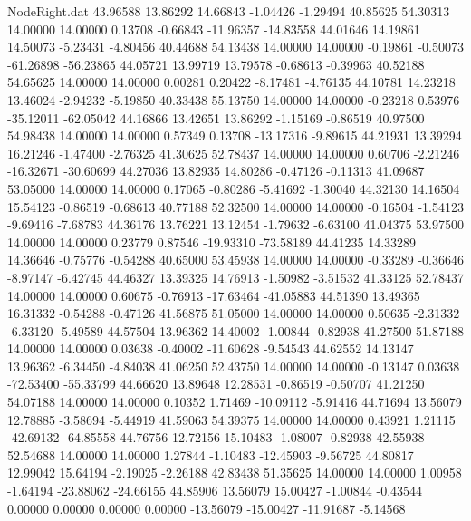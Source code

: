 \begin{filecontents}{NodeRight.dat}
  43.96588   13.86292   14.66843    -1.04426   -1.29494   40.85625   54.30313   14.00000   14.00000    0.13708   -0.66843  -11.96357  -14.83558
  44.01646   14.19861   14.50073    -5.23431   -4.80456   40.44688   54.13438   14.00000   14.00000   -0.19861   -0.50073  -61.26898  -56.23865
  44.05721   13.99719   13.79578    -0.68613   -0.39963   40.52188   54.65625   14.00000   14.00000    0.00281    0.20422   -8.17481   -4.76135
  44.10781   14.23218   13.46024    -2.94232   -5.19850   40.33438   55.13750   14.00000   14.00000   -0.23218    0.53976  -35.12011  -62.05042
  44.16866   13.42651   13.86292    -1.15169   -0.86519   40.97500   54.98438   14.00000   14.00000    0.57349    0.13708  -13.17316   -9.89615
  44.21931   13.39294   16.21246    -1.47400   -2.76325   41.30625   52.78437   14.00000   14.00000    0.60706   -2.21246  -16.32671  -30.60699
  44.27036   13.82935   14.80286    -0.47126   -0.11313   41.09687   53.05000   14.00000   14.00000    0.17065   -0.80286   -5.41692   -1.30040
  44.32130   14.16504   15.54123    -0.86519   -0.68613   40.77188   52.32500   14.00000   14.00000   -0.16504   -1.54123   -9.69416   -7.68783
  44.36176   13.76221   13.12454    -1.79632   -6.63100   41.04375   53.97500   14.00000   14.00000    0.23779    0.87546  -19.93310  -73.58189
  44.41235   14.33289   14.36646    -0.75776   -0.54288   40.65000   53.45938   14.00000   14.00000   -0.33289   -0.36646   -8.97147   -6.42745
  44.46327   13.39325   14.76913    -1.50982   -3.51532   41.33125   52.78437   14.00000   14.00000    0.60675   -0.76913  -17.63464  -41.05883
  44.51390   13.49365   16.31332    -0.54288   -0.47126   41.56875   51.05000   14.00000   14.00000    0.50635   -2.31332   -6.33120   -5.49589
  44.57504   13.96362   14.40002    -1.00844   -0.82938   41.27500   51.87188   14.00000   14.00000    0.03638   -0.40002  -11.60628   -9.54543
  44.62552   14.13147   13.96362    -6.34450   -4.84038   41.06250   52.43750   14.00000   14.00000   -0.13147    0.03638  -72.53400  -55.33799
  44.66620   13.89648   12.28531    -0.86519   -0.50707   41.21250   54.07188   14.00000   14.00000    0.10352    1.71469  -10.09112   -5.91416
  44.71694   13.56079   12.78885    -3.58694   -5.44919   41.59063   54.39375   14.00000   14.00000    0.43921    1.21115  -42.69132  -64.85558
  44.76756   12.72156   15.10483    -1.08007   -0.82938   42.55938   52.54688   14.00000   14.00000    1.27844   -1.10483  -12.45903   -9.56725
  44.80817   12.99042   15.64194    -2.19025   -2.26188   42.83438   51.35625   14.00000   14.00000    1.00958   -1.64194  -23.88062  -24.66155
  44.85906   13.56079   15.00427    -1.00844   -0.43544    0.00000    0.00000    0.00000    0.00000  -13.56079  -15.00427  -11.91687   -5.14568

\end{filecontents}
